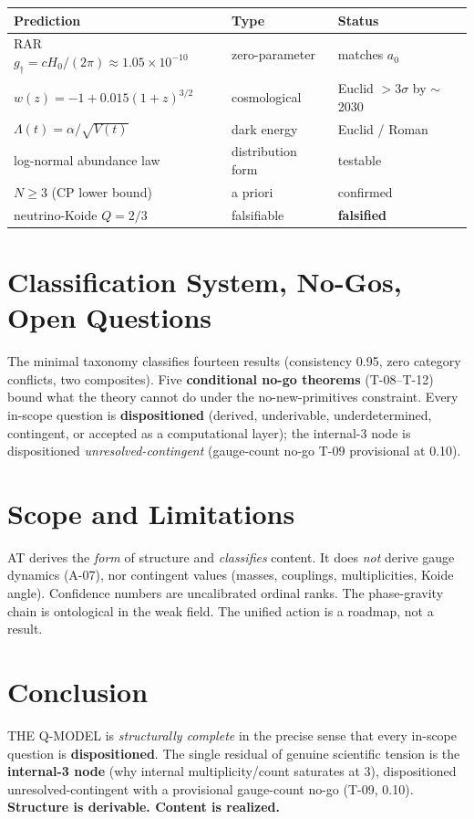 \documentclass[11pt,a4paper]{article}
\begin{document}
\begin{center}
\begin{tabular}{lll}
\toprule
Prediction & Type & Status \\
\midrule
RAR $g_\dagger=cH_0/(2\pi)\approx1.05\times10^{-10}$ & zero-parameter & matches $a_0$ \\
$w(z)=-1+0.015(1+z)^{3/2}$ & cosmological & Euclid $>3\sigma$ by $\sim$2030 \\
$\Lambda(t)=\alpha/\sqrt{V(t)}$ & dark energy & Euclid / Roman \\
log-normal abundance law & distribution form & testable \\
$N\ge3$ (CP lower bound) & a priori & confirmed \\
neutrino-Koide $Q=2/3$ & falsifiable & \textbf{falsified} \\
\bottomrule
\end{tabular}
\end{center}

\section{Classification System, No-Gos, Open Questions}
\label{sec:closure}

The minimal taxonomy classifies fourteen results (consistency 0.95, zero category
conflicts, two composites). Five \textbf{conditional no-go theorems} (T-08--T-12) bound
what the theory cannot do under the no-new-primitives constraint. Every in-scope question
is \textbf{dispositioned} (derived, underivable, underdetermined, contingent, or accepted
as a computational layer); the internal-3 node is dispositioned
\emph{unresolved-contingent} (gauge-count no-go T-09 provisional at 0.10).

\section{Scope and Limitations}
\label{sec:scope}

AT derives the \emph{form} of structure and \emph{classifies} content. It does \emph{not}
derive gauge dynamics (A-07), nor contingent values (masses, couplings, multiplicities,
Koide angle). Confidence numbers are uncalibrated ordinal ranks. The phase-gravity chain is
ontological in the weak field. The unified action is a roadmap, not a result.

\section{Conclusion}
\label{sec:conclusion}

THE Q-MODEL is \emph{structurally complete} in the precise sense that every in-scope
question is \textbf{dispositioned}. The single residual of genuine scientific tension is
the \textbf{internal-3 node} (why internal multiplicity/count saturates at 3),
dispositioned unresolved-contingent with a provisional gauge-count no-go (T-09, 0.10).
\textbf{Structure is derivable. Content is realized.}
\end{document}
